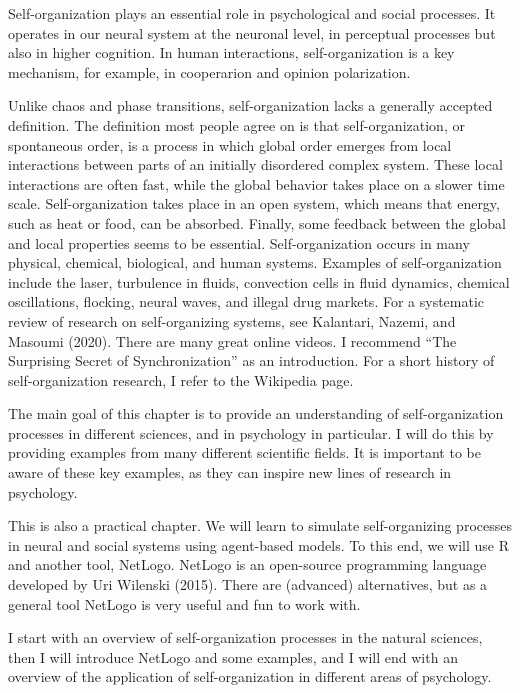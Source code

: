 \documentclass[
  a4paper,
  DIV=11,
  numbers=noendperiod]{scrreprt}
\begin{document}
Self-organization plays an essential role in psychological and social
processes. It operates in our neural system at the neuronal level, in
perceptual processes but also in higher cognition. In human
interactions, self-organization is a key mechanism, for example, in
cooperarion and opinion polarization.

Unlike chaos and phase transitions, self-organization lacks a generally
accepted definition. The definition most people agree on is that
self-organization, or spontaneous order, is a process in which global
order emerges from local interactions between parts of an initially
disordered complex system. These local interactions are often fast,
while the global behavior takes place on a slower time scale.
Self-organization takes place in an open system, which means that
energy, such as heat or food, can be absorbed. Finally, some feedback
between the global and local properties seems to be essential.
Self-organization occurs in many physical, chemical, biological, and
human systems. Examples of self-organization include the laser,
turbulence in fluids, convection cells in fluid dynamics, chemical
oscillations, flocking, neural waves, and illegal drug markets. For a
systematic review of research on self-organizing systems, see Kalantari,
Nazemi, and Masoumi (2020). There are many great online videos. I
recommend ``The Surprising Secret of Synchronization'' as an
introduction. For a short history of self-organization research, I refer
to the Wikipedia page.

The main goal of this chapter is to provide an understanding of
self-organization processes in different sciences, and in psychology in
particular. I will do this by providing examples from many different
scientific fields. It is important to be aware of these key examples, as
they can inspire new lines of research in psychology.

This is also a practical chapter. We will learn to simulate
self-organizing processes in neural and social systems using agent-based
models. To this end, we will use R and another tool, NetLogo. NetLogo is
an open-source programming language developed by Uri Wilenski (2015).
There are (advanced) alternatives, but as a general tool NetLogo is very
useful and fun to work with.

I start with an overview of self-organization processes in the natural
sciences, then I will introduce NetLogo and some examples, and I will
end with an overview of the application of self-organization in
different areas of psychology.
\end{document}
